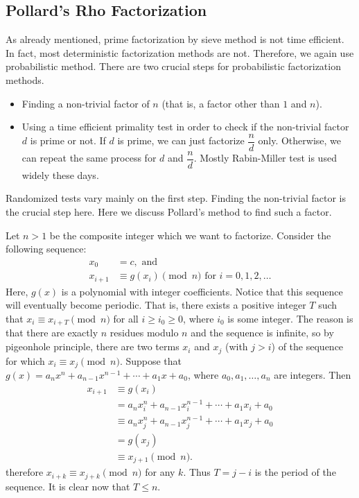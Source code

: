 \documentclass{subfiles}
\begin{document}
	\subsection{Pollard's Rho Factorization}
	As already mentioned, prime factorization by sieve method is not time efficient. In fact, most deterministic factorization methods are not. Therefore, we again use probabilistic method. There are two crucial steps for probabilistic factorization methods.
	\begin{itemize}
		\item Finding a non-trivial factor of $n$ (that is, a factor other than $1$ and $n$).
		\item Using a time efficient primality test in order to check if the non-trivial factor $d$ is prime or not. If $d$ is prime, we can just factorize $\dfrac{n}{d}$ only. Otherwise, we can repeat the same process for $d$ and $\dfrac{n}{d}$. Mostly Rabin-Miller test is used widely these days.
	\end{itemize}
	Randomized tests vary mainly on the first step. Finding the non-trivial factor is the crucial step here. Here we discuss Pollard's method to find such a factor.
	
	Let $n>1$ be the composite integer which we want to factorize. Consider the following sequence:
	\begin{align*}
		x_0 &= c, \text{ and }\\
		x_{i+1} &\equiv g(x_i) \pmod n \text{ for } i=0, 1, 2, \ldots
	\end{align*}
	Here, $g(x)$ is a polynomial with integer coefficients. Notice that this sequence will eventually become periodic. That is, there exists a positive integer $T$ such that $x_i \equiv x_{i+T} \pmod n$ for all $i\geq i_0\geq 0$, where $i_0$ is some integer. The reason is that there are exactly $n$ residues modulo $n$ and the sequence is infinite, so by pigeonhole principle, there are two terms $x_i$ and $x_j$ (with $j>i$) of the sequence for which $x_i \equiv x_j \pmod n$. Suppose that $g(x)=a_nx^n+a_{n-1}x^{n-1} + \cdots + a_1x+a_0$, where $a_0, a_1, \ldots, a_n$ are integers. Then
	\begin{align*}
		x_{i+1} &\equiv g(x_i) \\
		&= a_nx_i^n+a_{n-1}x_i^{n-1} + \cdots + a_1x_i+a_0 \\
		&\equiv a_nx_j^n+a_{n-1}x_j^{n-1} + \cdots + a_1x_j+a_0\\
		&= g(x_j) \\
		&\equiv x_{j+1} \pmod n.
	\end{align*}
	therefore $x_{i+k} \equiv x_{j+k} \pmod n $ for any $k$. Thus $T=j-i$ is the period of the sequence. It is clear now that $T \leq n$. 
	
\end{document}
